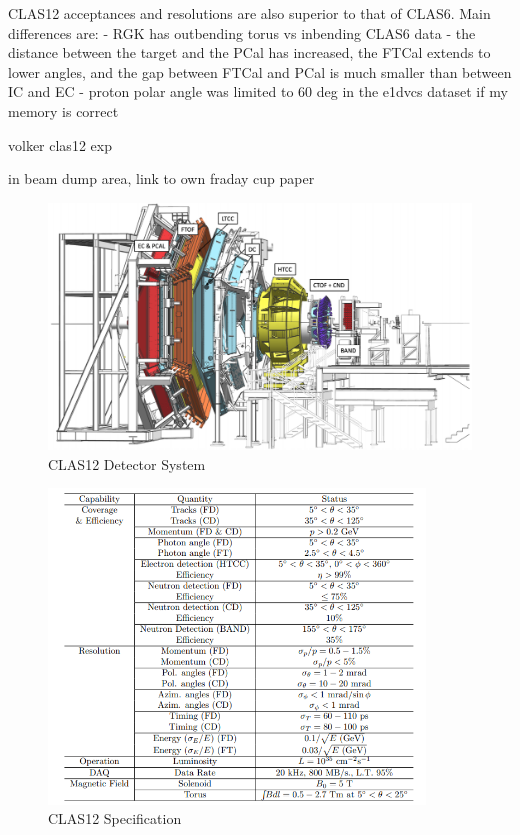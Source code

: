 
CLAS12 acceptances and resolutions are also superior to that of CLAS6. Main differences are:
- RGK has outbending torus vs inbending CLAS6 data
- the distance between the target and the PCal has increased, the FTCal extends to lower angles, and the gap between FTCal and PCal is much smaller than between IC and EC
- proton polar angle was limited to 60 deg in the e1dvcs dataset if my memory is correct


    volker clas12 exp \cite{Burkert2020TheLaboratory}


    in beam dump area, link to own fraday cup paper \cite{Johnston2019RealizationElectrons}
    \begin{figure}[H]
        \centering
        \includegraphics[width=12cm]{Chapters/Ch2-Experiment/clas-12-system/pics/other/CLA12.PNG}
        \caption{ CLAS12 Detector System }
    \end{figure}
    
    \begin{figure}[H]
        \centering
        \includegraphics[width=10cm]{Chapters/Ch2-Experiment/clas-12-system/pics/other/clas12-params.PNG}
        \caption{CLAS12 Specification}
    \end{figure}

